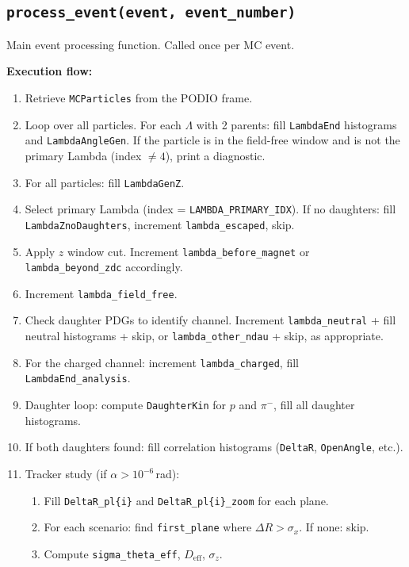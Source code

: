 \documentclass[11pt]{article}
\newcommand{\sx}{\sigma_x}
\begin{document}
\subsection{\texttt{process\_event(event, event\_number)}}

Main event processing function. Called once per MC event.

\textbf{Execution flow:}
\begin{enumerate}
  \item Retrieve \texttt{MCParticles} from the PODIO frame.
  \item Loop over all particles. For each $\Lambda$ with 2 parents:
        fill \texttt{LambdaEnd} histograms and \texttt{LambdaAngleGen}.
        If the particle is in the field-free window and is not the
        primary Lambda (index $\neq 4$), print a diagnostic.
  \item For all particles: fill \texttt{LambdaGenZ}.
  \item Select primary Lambda (index = \texttt{LAMBDA\_PRIMARY\_IDX}).
        If no daughters: fill \texttt{LambdaZnoDaughters},
        increment \texttt{lambda\_escaped}, skip.
  \item Apply $z$ window cut. Increment
        \texttt{lambda\_before\_magnet} or \texttt{lambda\_beyond\_zdc}
        accordingly.
  \item Increment \texttt{lambda\_field\_free}.
  \item Check daughter PDGs to identify channel. Increment
        \texttt{lambda\_neutral} + fill neutral histograms + skip, or
        \texttt{lambda\_other\_ndau} + skip, as appropriate.
  \item For the charged channel: increment \texttt{lambda\_charged},
        fill \texttt{LambdaEnd\_analysis}.
  \item Daughter loop: compute \texttt{DaughterKin} for $p$ and $\pi^-$,
        fill all daughter histograms.
  \item If both daughters found: fill correlation histograms
        (\texttt{DeltaR}, \texttt{OpenAngle}, etc.).
  \item Tracker study (if $\alpha > 10^{-6}$\,rad):
        \begin{enumerate}
          \item Fill \texttt{DeltaR\_pl\{i\}} and \texttt{DeltaR\_pl\{i\}\_zoom}
                for each plane.
          \item For each scenario: find \texttt{first\_plane} where
                $\Delta R > \sx$. If none: skip.
          \item Compute \texttt{sigma\_theta\_eff}, $D_\text{eff}$, $\sigma_z$.

\end{enumerate}
\end{enumerate}
\end{document}

